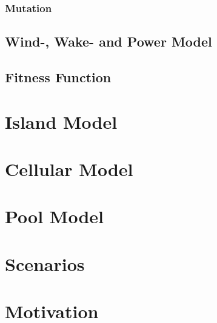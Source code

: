 \documentclass{article}
\begin{document}
\subsubsection{Mutation}


\subsection{Wind-, Wake- and Power Model}\label{subsection:wind-, wake- and power model}


\subsection{Fitness Function}\label{subsection:fitness function}


\section{Island Model}\label{section:island model}


\section{Cellular Model}\label{section:cellular model}


\section{Pool Model}\label{section:pool model}


\section{Scenarios}\label{section:scenarios}


\section{Motivation}\label{section:motivation}
\end{document}
